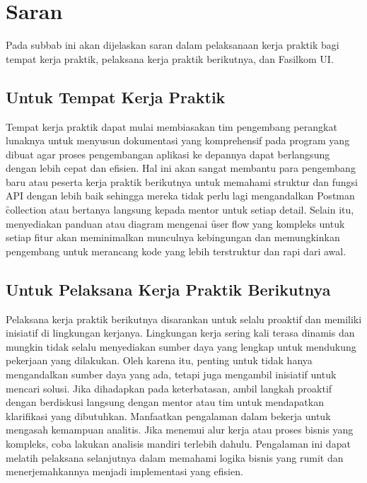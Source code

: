 \section{Saran}
\label{sec:saran}
Pada subbab ini akan dijelaskan saran dalam pelaksanaan kerja praktik bagi
tempat kerja praktik, pelaksana kerja praktik berikutnya, dan Fasilkom UI.

\subsection{Untuk Tempat Kerja Praktik}
\label{sec:saranTempatKp}
Tempat kerja praktik dapat mulai membiasakan tim pengembang perangkat lunaknya
untuk menyusun dokumentasi yang komprehensif pada program yang dibuat agar
proses pengembangan aplikasi ke depannya dapat berlangsung dengan lebih cepat
dan efisien. Hal ini akan sangat membantu para pengembang baru atau peserta
kerja praktik berikutnya untuk memahami struktur dan fungsi API dengan lebih
baik sehingga mereka tidak perlu lagi mengandalkan Postman \f{collection} atau
bertanya langsung kepada mentor untuk setiap detail. Selain itu, menyediakan
panduan atau diagram mengenai \f{user flow} yang kompleks untuk setiap fitur
akan meminimalkan munculnya kebingungan dan memungkinkan pengembang untuk
merancang kode yang lebih terstruktur dan rapi dari awal.

\subsection{Untuk Pelaksana Kerja Praktik Berikutnya}
\label{sec:saranPelaksanaBerikutnya}
Pelaksana kerja praktik berikutnya disarankan untuk selalu proaktif dan
memiliki inisiatif di lingkungan kerjanya. Lingkungan kerja sering kali terasa
dinamis dan mungkin tidak selalu menyediakan sumber daya yang lengkap untuk
mendukung pekerjaan yang dilakukan. Oleh karena itu, penting untuk tidak hanya
mengandalkan sumber daya yang ada, tetapi juga mengambil inisiatif untuk
mencari solusi. Jika dihadapkan pada keterbatasan, ambil langkah proaktif
dengan berdiskusi langsung dengan mentor atau tim untuk mendapatkan klarifikasi
yang dibutuhkan. Manfaatkan pengalaman dalam bekerja untuk mengasah kemampuan
analitis. Jika menemui alur kerja atau proses bisnis yang kompleks, coba
lakukan analisis mandiri terlebih dahulu. Pengalaman ini dapat melatih
pelaksana selanjutnya dalam memahami logika bisnis yang rumit dan
menerjemahkannya menjadi implementasi yang efisien.

